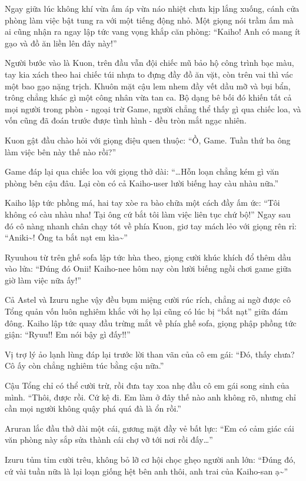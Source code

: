 \documentclass[../main.tex]{subfiles}
\begin{document}
Ngay giữa lúc không khí vừa ấm áp vừa náo nhiệt chưa kịp lắng xuống, cánh cửa phòng làm việc bật tung ra với một tiếng động nhỏ. Một giọng nói trầm ấm mà ai cũng nhận ra ngay lập tức vang vọng khắp căn phòng: ``Kaiho! Anh có mang ít gạo và đồ ăn liền lên đây này!''

Người bước vào là Kuon, trên đầu vẫn đội chiếc mũ bảo hộ công trình bạc màu, tay kia xách theo hai chiếc túi nhựa to đựng đầy đồ ăn vặt, còn trên vai thì vác một bao gạo nặng trịch. Khuôn mặt cậu lem nhem đầy vết dầu mỡ và bụi bẩn, trông chẳng khác gì một công nhân vừa tan ca. Bộ dạng bê bối đó khiến tất cả mọi người trong phòn - ngoại trừ Game, người chẳng thể thấy gì qua chiếc loa, và vốn cũng đã đoán trước được tình hình - đều tròn mắt ngạc nhiên.

Kuon gật đầu chào hỏi với giọng điệu quen thuộc: ``Ồ, Game. Tuần thứ ba ông làm việc bên này thế nào rồi?''

Game đáp lại qua chiếc loa với giọng thở dài: ``\dots Hỗn loạn chẳng kém gì văn phòng bên cậu đâu. Lại còn có cả Kaiho-user lười biếng hay càu nhàu nữa.''

Kaiho lập tức phồng má, hai tay xòe ra bào chữa một cách đầy ấm ức: ``Tôi không có càu nhàu nha! Tại ông cứ bắt tôi làm việc liên tục chứ bộ!'' Ngay sau đó cô nàng nhanh chân chạy tót về phía Kuon, giơ tay mách lẻo với giọng rên rỉ: ``Aniki\~{}! Ông ta bắt nạt em kìa\~{}''

Ryuuhou từ trên ghế sofa lập tức hùa theo, giọng cười khúc khích đổ thêm dầu vào lửa: ``Đúng đó Onii! Kaiho-nee hôm nay còn lười biếng ngồi chơi game giữa giờ làm việc nữa ấy!''

Cả Astel và Izuru nghe vậy đều bụm miệng cười rúc rích, chẳng ai ngờ được cô Tổng quản vốn luôn nghiêm khắc với họ lại cũng có lúc bị ``bắt nạt'' giữa đám đông. Kaiho lập tức quay đầu trừng mắt về phía ghế sofa, giọng phập phồng tức giận: ``Ryuu!! Em nói bậy gì đấy!!''

Vị trợ lý ảo lạnh lùng đáp lại trước lời than vãn của cô em gái: ``Đó, thấy chưa? Cô ấy còn chẳng nghiêm túc bằng cậu nữa.''

Cậu Tổng chỉ có thể cười trừ, rồi đưa tay xoa nhẹ đầu cô em gái song sinh của mình. ``Thôi, được rồi. Cứ kệ đi. Em làm ở đây thế nào anh không rõ, nhưng chỉ cần mọi người không quậy phá quá đà là ổn rồi.''

Aruran lắc đầu thở dài một cái, gương mặt đầy vẻ bất lực: ``Em có cảm giác cái văn phòng này sắp sửa thành cái chợ vỡ tới nơi rồi đấy\dots''

Izuru tủm tỉm cười trêu, không bỏ lỡ cơ hội chọc ghẹo người anh lớn: ``Đúng đó, cứ vài tuần nữa là lại loạn giống hệt bên anh thôi, anh trai của Kaiho-san ạ\~{}''
\end{document}
